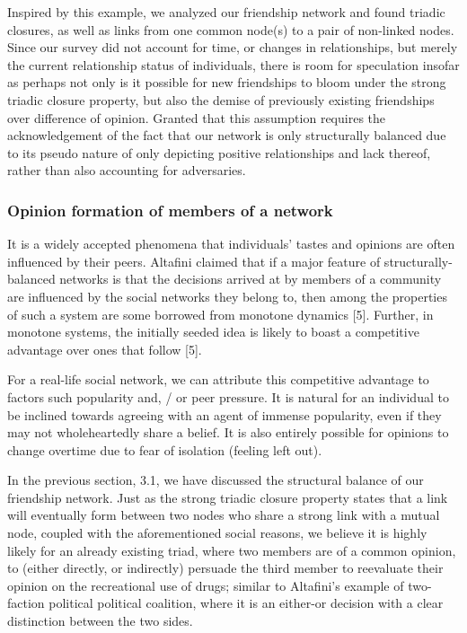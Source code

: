 \documentclass[runningheads]{llncs}
\begin{document}
Inspired by this example, we analyzed our friendship network and found triadic closures, as well as links from one common node(s) to a pair of non-linked nodes. Since our survey did not account for time, or changes in relationships, but merely the current relationship status of individuals, there is room for speculation insofar as perhaps not only is it possible for new friendships to bloom under the strong triadic closure property, but also the demise of previously existing friendships over difference of opinion. Granted that this assumption requires the acknowledgement of the fact that our network is only structurally balanced due to its pseudo nature of only depicting positive relationships and lack thereof, rather than also accounting for adversaries.

\subsubsection{Opinion formation of members of a network}
It is a widely accepted phenomena that individuals' tastes and opinions are often influenced by their peers. Altafini claimed that if a major feature of structurally-balanced networks is that the decisions arrived at by members of a community are influenced by the social networks they belong to, then among the properties of such a system are some borrowed from monotone dynamics [5]. Further, in monotone systems, the initially seeded idea is likely to boast a competitive advantage over ones that follow [5]. 

For a real-life social network, we can attribute this competitive advantage to factors such popularity and, / or peer pressure. It is natural for an individual to be inclined towards agreeing with an agent of immense popularity, even if they may not wholeheartedly share a belief. It is also entirely possible for opinions to change overtime due to fear of isolation (feeling left out). 

In the previous section, 3.1, we have discussed the structural balance of our friendship network. Just as the strong triadic closure property states that a link will eventually form between two nodes who share a strong link with a mutual node, coupled with the aforementioned social reasons, we believe it is highly likely for an already existing triad, where two members are of a common opinion, to (either directly, or indirectly) persuade the third member to reevaluate their opinion on the recreational use of drugs; similar to Altafini's example of two-faction political political coalition, where it is an either-or decision with a clear distinction between the two sides.
\end{document}
